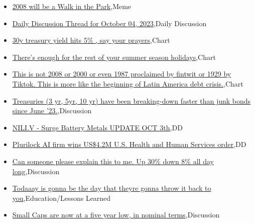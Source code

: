 \documentclass{article}%
\begin{document}
%
\begin{itemize}%
\item%
\href{https://reddit.com/r/wallstreetbets/comments/16zk32w/2008\_will\_be\_a\_walk\_in\_the\_park/}{2008 will be a Walk in the Park},Meme%
\item%
\href{https://reddit.com/r/wallstreetbets/comments/16zj3ou/daily\_discussion\_thread\_for\_october\_04\_2023/}{Daily Discussion Thread for October 04, 2023},Daily Discussion%
\item%
\href{https://reddit.com/r/wallstreetbets/comments/16ziuxu/30y\_treasury\_yield\_hits\_5\_say\_your\_prayers/}{30y treasury yield hits 5\% , say your prayers},Chart%
\item%
\href{https://reddit.com/r/wallstreetbets/comments/16zg2lc/theres\_enough\_for\_the\_rest\_of\_your\_summer\_season/}{There's enough for the rest of your summer season holidays},Chart%
\item%
\href{https://reddit.com/r/wallstreetbets/comments/16zdznz/this\_is\_not\_2008\_or\_2000\_or\_even\_1987\_proclaimed/}{This is not 2008 or 2000 or even 1987 proclaimed by fintwit or 1929 by Tiktok. This is more like the beginning of Latin America debt crisis.},Chart%
\item%
\href{https://reddit.com/r/wallstreetbets/comments/16zd24e/treasuries\_3\_yr\_5yr\_10\_yr\_have\_been\_breakingdown/}{Treasuries (3 yr, 5yr, 10 yr) have been breaking-down faster than junk bonds since June '23.},Discussion%
\item%
\href{https://reddit.com/r/Baystreetbets/comments/16z9jxr/niliv\_surge\_battery\_metals\_update\_oct\_3th/}{NILI.V - Surge Battery Metals UPDATE OCT 3th},DD%
\item%
\href{https://reddit.com/r/Baystreetbets/comments/16yvpsi/plurilock\_ai\_firm\_wins\_us42m\_us\_health\_and\_human/}{Plurilock AI firm wins US\$4.2M U.S. Health and Human Services order},DD%
\item%
\href{https://reddit.com/r/StockMarket/comments/16z1b8x/can\_someone\_please\_explain\_this\_to\_me\_up\_30\_down/}{Can someone please explain this to me. Up 30\% down 8\% all day long},Discussion%
\item%
\href{https://reddit.com/r/StockMarket/comments/16yvgtr/todaaay\_is\_gonna\_be\_the\_day\_that\_theyre\_gonna/}{Todaaay is gonna be the day that theyre gonna throw it back to you},Education/Lessons Learned%
\item%
\href{https://reddit.com/r/StockMarket/comments/16yuvd5/small\_caps\_are\_now\_at\_a\_five\_year\_low\_in\_nominal/}{Small Caps are now at a five year low, in nominal terms},Discussion%
\end{itemize}%
\end{document}
